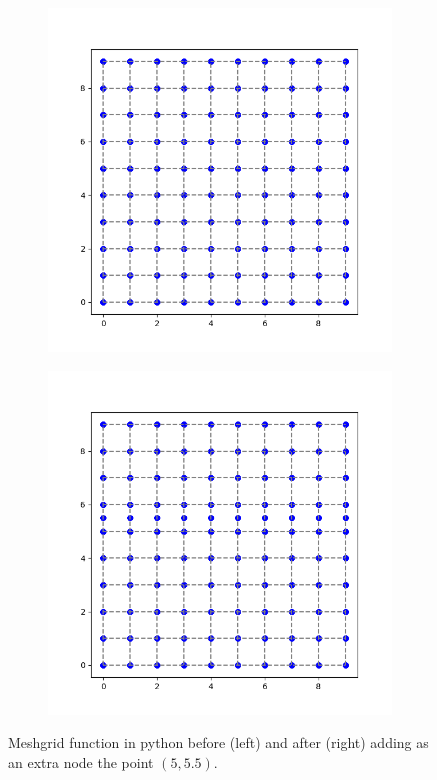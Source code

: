 \documentclass[12pt, oneside]{book}
\begin{document}
\begin{figure}[h!]
    \centering
    \begin{subfigure}[b]{0.49\textwidth}
        \centering
        \includegraphics[width=\textwidth]{Imagenes/CFDTD2D_Meshgrid1.png}
    \end{subfigure}
    \begin{subfigure}[b]{0.49\textwidth}
        \centering
        \includegraphics[width=\textwidth]{Imagenes/CFDTD2D_Meshgrid2.png}
    \end{subfigure}
    \caption{Meshgrid function in python before (left) and after (right) adding as an extra node the point $(5, 5.5)$.}
    \label{fig:CFDTD2D_Meshgrid}
\end{figure}
\end{document}
